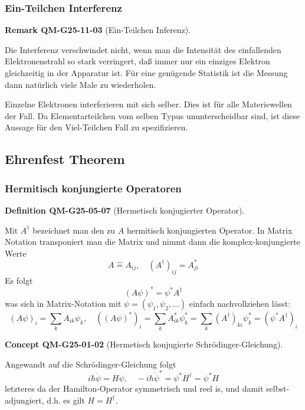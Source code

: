 \documentclass[10pt, letterpaper]{article}
\newcommand{\CustomHeading}[3]{%
  \par\medskip\noindent%
  \textbf{#1 #2} \textnormal{(#3)}.\enskip%
}
\newenvironment{DEF}[2]{\begin{unitbox}\CustomHeading{Definition}{#1}{#2}}{\end{unitbox}}
\newenvironment{REM}[2]{\begin{unitbox}\CustomHeading{Remark}{#1}{#2}}{\end{unitbox}}
\newenvironment{CONC}[2]{\begin{unitbox}\CustomHeading{Concept}{#1}{#2}}{\end{unitbox}}
\begin{document}
\subsubsection*{Ein-Teilchen Interferenz}


\begin{REM}{QM-G25-11-03}{Ein-Teilchen Inferenz}
Die Interferenz verschwindet nicht, wenn man die Intensität des einfallenden Elektronenstrahl so stark verringert, daß immer nur ein einziges Elektron gleichzeitig in der Apparatur ist. Für eine genügende Statistik ist die Messung dann natürlich viele Male zu wiederholen.
\end{REM}

Einzelne Elektronen interferieren mit sich selber. Dies ist für alle Materiewellen der Fall. Da Elementarteilchen vom selben Typus ununterscheidbar sind, ist diese Aussage für den Viel-Teilchen Fall zu spezifizieren.





\subsection*{Ehrenfest Theorem}


\subsubsection*{Hermitisch konjungierte Operatoren}

\begin{DEF}{QM-G25-05-07}{Hermetisch konjugierter Operator}
Mit $A^{\dagger}$ bezeichnet man den zu $A$ hermitisch konjungierten Operator. In Matrix Notation transponiert man die Matrix und nimmt dann die komplex-konjungierte Werte
$$
A \hat{=} A_{i j}, \quad\left(A^{\dagger}\right)_{i j}=A_{j i}^{*}
$$
Es folgt
$$
(A \psi)^{*}=\psi^{*} A^{\dagger}
$$
was sich in Matrix-Notation mit $\psi=\left(\psi_{1}, \psi_{2}, \ldots\right)$ einfach nachvollziehen lässt:
$$
(A \psi)_{i}=\sum_{k} A_{i k} \psi_{k}, \quad\left((A \psi)^{*}\right)_{i}=\sum_{k} A_{i k}^{*} \psi_{k}^{*}=\sum_{k}\left(A^{\dagger}\right)_{k i} \psi_{k}^{*}=\left(\psi^{*} A^{\dagger}\right)_{i}
$$
\end{DEF}


\begin{CONC}{QM-G25-01-02}{Hermetisch konjugierte Schrödinger-Gleichung}
Angewandt auf die Schrödinger-Gleichung folgt
$$
i \hbar \dot{\psi}=H \psi, \quad-i \hbar \dot{\psi}^{*}=\psi^{*} H^{\dagger}=\psi^{*} H
$$
letzteres da der Hamilton-Operator symmetrisch und reel is, und damit selbst-adjungiert, d.h. es gilt $H=H^{\dagger}$.
\end{CONC}
\end{document}
